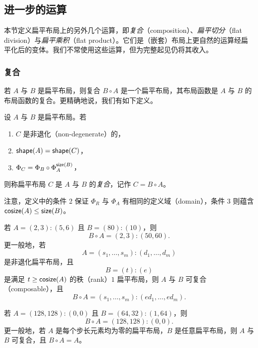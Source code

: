 \newpage

\subsection{进一步的运算}

本节定义扁平布局上的另外几个运算，即{\it 复合}（composition）、{\it 扁平切分}（flat division）与{\it 扁平乘积}（flat product）。它们是（嵌套）布局上更自然的运算经扁平化后的变体。我们不常使用这些运算，但为完整起见仍将其收入。

\subsubsection{复合}
若 $A$ 与 $B$ 是扁平布局，则复合 $B \circ A$ 是一个扁平布局，其布局函数是 $A$ 与 $B$ 的布局函数的复合。更精确地说，我们有如下定义。

\begin{definition}\label{definitionofflatlayoutcomposition} 设 $A$ 与 $B$ 是扁平布局。若
    \begin{enumerate}
    \item $C$ 是非退化（non-degenerate）的，
    \item $\mathsf{shape}(A) = \mathsf{shape}(C)$，
    \item $\Phi_C = \Phi_B \circ \Phi_A^{\mathsf{size}(B)}$，
    \end{enumerate}
则称扁平布局 $C$ 是 $A$ 与 $B$ 的{\it 复合}，记作 $C = B \circ A$。
\end{definition}

\begin{remark}
    注意，定义中的条件 2 保证 $\Phi_R$ 与 $\Phi_A$ 有相同的定义域（domain），条件 3 则蕴含 $\mathsf{cosize}(A) \leq \mathsf{size}(B)$。
\end{remark}

\begin{example}\label{flatcompositionexample1}
若 $A = (2,3):(5,6)$ 且 $B = (80):(10)$，则
\[
B \circ A = (2,3):(50,60).
\]
更一般地，若
\[
A = (s_1,\dots,s_m):(d_1,\dots,d_m)
\]
是非退化扁平布局，且
\[
B = (t):(e)
\]
是满足 $t \geq \mathsf{cosize}(A)$ 的秩（rank）$1$ 扁平布局，则 $A$ 与 $B$ 可复合（composable），且
\[
B \circ A = (s_1,\dots,s_m):(ed_1,\dots,ed_m).
\]
\end{example}

\begin{example}
    若 $A = (128,128):(0,0)$ 且 $B = (64,32):(1,64)$，则
    \[
    B \circ A = (128,128):(0,0).
    \]
    更一般地，若 $A$ 是每个步长元素均为零的扁平布局，$B$ 是任意扁平布局，则 $A$ 与 $B$ 可复合，且 $B \circ A = A$。
\end{example}

